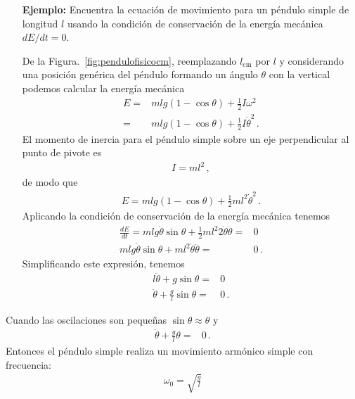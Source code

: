 \begin{itemize}
\item[\textbf{Ejemplo:}] Encuentra la ecuación de movimiento para un péndulo simple de longitud $l$  usando la condición de conservación de la energía mecánica $dE/dt=0$. 

De la Figura.~\ref{fig:pendulofisicocm}, reemplazando $l_{\text{cm}}$ por $l$ y considerando una posición genérica del péndulo formando un ángulo $\theta$ con la vertical podemos calcular la energía mecánica
\begin{align}
 E=& m l g(1-\cos\theta)+\frac{1}{2}I \omega^2\nonumber\\
 =& m l g(1-\cos\theta)+\frac{1}{2}I \dot\theta^2\,.
\end{align}
El momento de inercia para el péndulo simple sobre un eje perpendicular al punto de pivote es
\begin{align}
  I=ml^2\,,
\end{align}
de modo que
\begin{align}
  E=m l g(1-\cos\theta)+\frac{1}{2}m l^2 \dot\theta^2\,.
\end{align}
Aplicando la condición de conservación de la energía mecánica tenemos
\begin{align}
  \frac{dE}{dt}=mlg\dot\theta\sin\theta+\frac{1}{2}m l^2 2\dot\theta\ddot\theta=&0\nonumber\\
mlg\dot\theta\sin\theta+m l^2 \dot\theta\ddot\theta=&0\,.
\end{align}
Simplificando este expresión, tenemos
\begin{align}
 l\ddot\theta+ g\sin\theta=&0\nonumber\\
 \ddot\theta+ \frac{g}{l}\sin\theta=&0\,.
\end{align}
\end{itemize}
Cuando las oscilaciones son pequeñas $\sin\theta\approx\theta$ y
\begin{align}
   \ddot\theta+ \frac{g}{l}\theta=&0\,.
\end{align}
Entonces el péndulo simple realiza un movimiento armónico simple con frecuencia:
\begin{align}
  \omega_0=\sqrt{\frac{g}{l}}
\end{align}
